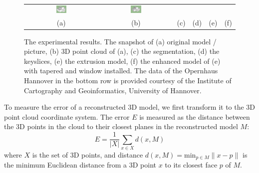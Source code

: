 \documentclass[10pt,journal,cspaper,compsoc]{IEEEtran}
\begin{document}
\begin{figure}[htbp]
\begin{center}
\begin{tabular}{cccccc}
\includegraphics[width=0.15\textwidth]{opernhaus_5.png} &
\includegraphics[width=0.15\textwidth]{opernhaus_6.png} \\
(a) & (b) & (c) & (d) & (e) & (f)
\end{tabular}
\end{center}
\caption{The experimental results. The snapshot of 
(a) original model / picture, 
(b) 3D point cloud of (a),
(c) the segmentation,
(d) the keyslices,
(e) the extrusion model,
(f) the enhanced model of (e) with tapered and window installed.
The data of the Opernhaus Hannover in the bottom row is provided courtesy of 
the Institute of Cartography and Geoinformatics, University of Hannover.
}
\label{fig:results}
\end{figure}

%
To measure the error of a reconstructed 3D model, we first transform it
to the 3D point cloud coordinate system.
The error $E$ is measured as the distance between the 3D points in the cloud
to their closest planes in the reconstructed model $M$:
\begin{equation}
E = \frac{1}{|X|}\sum_{x\in{X}}{d(x, M)}
\label{eq:em}
\end{equation}
where $X$ is the set of 3D points, and distance
$d(x, M) = \text{min}_{p \in M}\lVert x - p \lVert$ is the minimum
Euclidean distance from a 3D point $x$ to its closest face $p$ of $M$.
\end{document}
